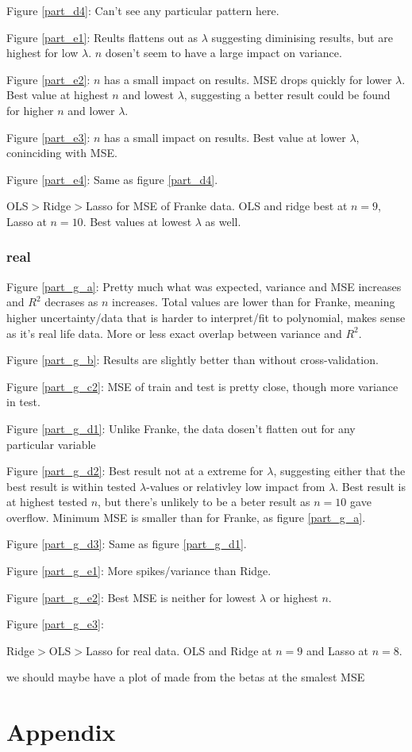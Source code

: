 \documentclass[a4paper,10pt,english]{article}
\begin{document}
Figure \ref{part_d4}: Can't see any particular pattern here.

Figure \ref{part_e1}: Reults flattens out as $\lambda$ suggesting diminising results, but are highest for low $\lambda$. $n$ dosen't seem to have a large impact on variance.

Figure \ref{part_e2}: $n$ has a small impact on results. MSE drops quickly for lower $\lambda$. Best value at highest $n$ and lowest $\lambda$, suggesting a better result could be found for higher $n$ and lower $\lambda$.

Figure \ref{part_e3}: $n$ has a small impact on results. Best value at lower $\lambda$, coninciding with MSE. 

Figure \ref{part_e4}: Same as figure \ref{part_d4}.

OLS$>$Ridge$>$Lasso for MSE of Franke data. OLS and ridge best at $n=9$, Lasso at $n=10$. Best values at lowest $\lambda$ as well.


\subsubsection{real}

Figure \ref{part_g_a}: Pretty much what was expected, variance and MSE increases and $R^2$ decrases as $n$ increases. Total values are lower than for Franke, meaning higher uncertainty/data that is harder to interpret/fit to polynomial, makes sense as it's real life data. More or less exact overlap between variance and $R^2$.

Figure \ref{part_g_b}: Results are slightly better than without cross-validation.

Figure \ref{part_g_c2}: MSE of train and test is pretty close, though more variance in test.

Figure \ref{part_g_d1}: Unlike Franke, the data dosen't flatten out for any particular variable

Figure \ref{part_g_d2}: Best result not at a extreme for $\lambda$, suggesting either that the best result is within tested $\lambda$-values or relativley low impact from $\lambda$. Best result is at highest tested $n$, but there's unlikely to be a beter result as $n=10$ gave overflow. Minimum MSE is smaller than for Franke, as figure \ref{part_g_a}. 

Figure \ref{part_g_d3}: Same as figure \ref{part_g_d1}.

Figure \ref{part_g_e1}: More spikes/variance than Ridge. 

Figure \ref{part_g_e2}: Best MSE is neither for lowest $\lambda$ or highest $n$.

Figure \ref{part_g_e3}: 


Ridge$>$OLS$>$Lasso for real data. OLS and Ridge at $n=9$ and Lasso at $n=8$.


we should maybe have a plot of made from the betas at the smalest MSE

\newpage

\section{Appendix}
\label{sec:appendix}

{}

\end{document}
